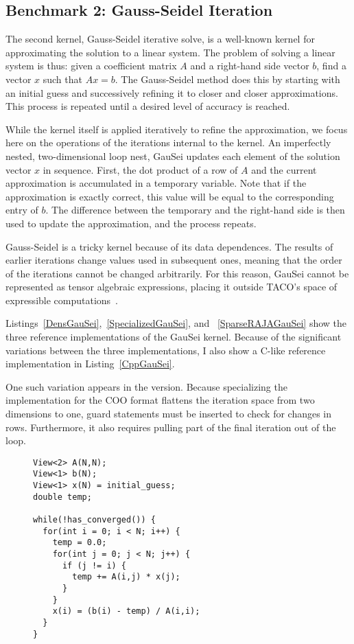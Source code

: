 \subsection{Benchmark 2: Gauss-Seidel Iteration}

The second kernel, Gauss-Seidel iterative solve, is a well-known kernel for approximating the solution to a linear system.
The problem of solving a linear system is thus: given a coefficient matrix $A$ and a right-hand side vector $b$, find a vector $x$ such that $Ax=b$.
The Gauss-Seidel method does this by starting with an initial guess and successively refining it to closer and closer approximations.
This process is repeated until a desired level of accuracy is reached.

While the kernel itself is applied iteratively to refine the approximation, we focus here on the operations of the iterations internal to the kernel.
An imperfectly nested, two-dimensional loop nest, GauSei updates each element of the solution vector $x$ in sequence.
First, the dot product of a row of $A$ and the current approximation is accumulated in a temporary variable.
Note that if the approximation is exactly correct, this value will be equal to the corresponding entry of $b$. 
The difference between the temporary and the right-hand side is then used to update the approximation, and the process repeats.

Gauss-Seidel is a tricky kernel because of its data dependences.
The results of earlier iterations change values used in subsequent ones, meaning that the order of the iterations cannot be changed arbitrarily. 
For this reason, GauSei cannot be represented as tensor algebraic expressions, placing it outside TACO's space of expressible computations~\cite{}.

Listings~\ref{DensGauSei},~\ref{SpecializedGauSei}, and ~\ref{SparseRAJAGauSei} show the three reference implementations of the GauSei kernel.
Because of the significant variations between the three implementations, I also show a C-like reference implementation in Listing~\ref{CppGauSei}.

One such variation appears in the \specialized{} version. 
Because specializing the implementation for the COO format flattens the iteration space from two dimensions to one, guard statements must be inserted to check for changes in rows. 
Furthermore, it also requires pulling part of the final iteration out of the loop.

\begin{figure}
\begin{lstlisting}[caption={C-like version of Gauss-Seidel iteration},label=CppGauSei]
View<2> A(N,N);
View<1> b(N);
View<1> x(N) = initial_guess;
double temp;

while(!has_converged()) {
  for(int i = 0; i < N; i++) {
    temp = 0.0;
    for(int j = 0; j < N; j++) {
      if (j != i) {
        temp += A(i,j) * x(j);
      }
    }
    x(i) = (b(i) - temp) / A(i,i);
  }
}
\end{lstlisting}
\end{figure}

